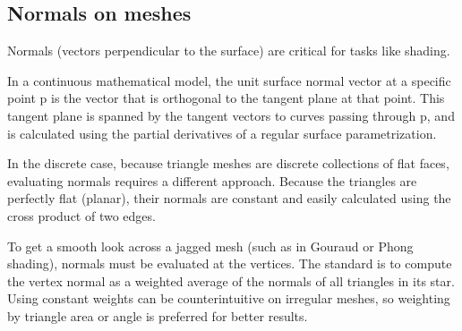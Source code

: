 \subsection{Normals on meshes}
Normals (vectors perpendicular to the surface) are critical for tasks like shading.\par
In a continuous mathematical model, the unit surface normal vector at a specific point p is the vector that is orthogonal to the tangent plane at that point. This tangent plane is spanned by the tangent vectors to curves passing through p, and is calculated using the partial derivatives of a regular surface parametrization.\par
In the discrete case, because triangle meshes are discrete collections of flat faces, evaluating normals requires a different approach. Because the triangles are perfectly flat (planar), their normals are constant and easily calculated using the cross product of two edges. \par
To get a smooth look across a jagged mesh (such as in Gouraud or Phong shading), normals must be evaluated at the vertices. The standard is to compute the vertex normal as a weighted average of the normals of all triangles in its star. Using constant weights can be counterintuitive on irregular meshes, so weighting by triangle area or angle is preferred for better results. 
